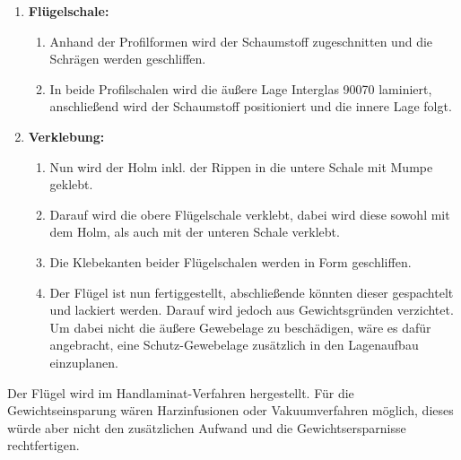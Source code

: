 \begin{enumerate}
\begin{enumerate}
	\end{enumerate}
	\item \textbf{Flügelschale:}
	\begin{enumerate}
		\item Anhand der Profilformen wird der Schaumstoff zugeschnitten und die Schrägen werden geschliffen.
		\item In beide Profilschalen wird die äußere Lage Interglas 90070 laminiert, anschließend wird der Schaumstoff positioniert und die innere Lage folgt.
	\end{enumerate}
	\item \textbf{Verklebung:}
	\begin{enumerate}
		\item Nun wird der Holm inkl. der Rippen in die untere Schale mit Mumpe geklebt.
		\item Darauf wird die obere Flügelschale verklebt, dabei wird diese sowohl mit dem Holm, als auch mit der unteren Schale verklebt.
		\item Die Klebekanten beider Flügelschalen werden in Form geschliffen.
		\item Der Flügel ist nun fertiggestellt, abschließende könnten dieser gespachtelt und lackiert werden. Darauf wird jedoch aus Gewichtsgründen verzichtet. Um dabei nicht die äußere Gewebelage zu beschädigen, wäre es dafür angebracht, eine Schutz-Gewebelage zusätzlich in den Lagenaufbau einzuplanen.
	\end{enumerate}
\end{enumerate}

\noindent Der Flügel wird im Handlaminat-Verfahren hergestellt. Für die Gewichtseinsparung wären Harzinfusionen oder Vakuumverfahren möglich, dieses würde aber nicht den zusätzlichen Aufwand und die Gewichtsersparnisse rechtfertigen.
